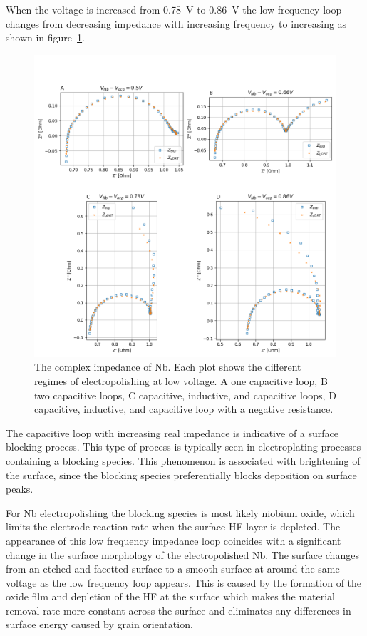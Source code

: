 \documentclass{revtex4-2}
\begin{document}
When the voltage is increased from \qty{0.78}{\volt} to \qty{0.86}{\volt} the low frequency loop changes from decreasing impedance with increasing frequency to increasing as shown in figure~\ref{fig:nyquistplot}.

\begin{figure}[t]
  \label{fig:nyquistplot}
  \includegraphics[width=\textwidth]{../figures/nyquist.png}
  \caption{The complex impedance of Nb. Each plot shows the different regimes of electropolishing at low voltage. A one capacitive loop, B two capacitive loops, C capacitive, inductive, and capacitive loops, D capacitive, inductive, and capacitive loop with a negative resistance.}
\end{figure}

The capacitive loop with increasing real impedance is indicative of a surface blocking process. This type of process is typically seen in electroplating processes containing a blocking species. This phenomenon is associated with brightening of the surface, since the blocking species preferentially blocks deposition on surface peaks.

For Nb electropolishing the blocking species is most likely niobium oxide, which limits the electrode reaction rate when the surface HF layer is depleted. The appearance of this low frequency impedance loop coincides with a significant change in the surface morphology of the electropolished Nb. The surface changes from an etched and facetted surface to a smooth surface at around the same voltage as the low frequency loop appears. This is caused by the formation of the oxide film and depletion of the HF at the surface which makes the material removal rate more constant across the surface and eliminates any differences in surface energy caused by grain orientation.
\end{document}
